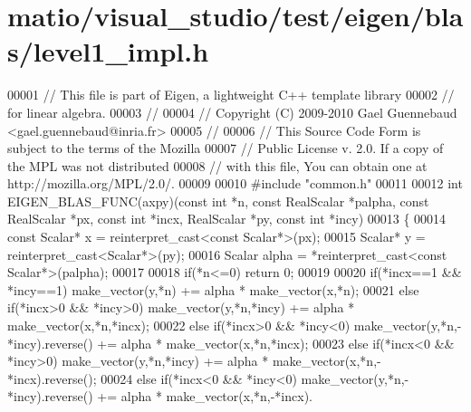 \hypertarget{matio_2visual__studio_2test_2eigen_2blas_2level1__impl_8h_source}{}\section{matio/visual\+\_\+studio/test/eigen/blas/level1\+\_\+impl.h}
\label{matio_2visual__studio_2test_2eigen_2blas_2level1__impl_8h_source}

\begin{DoxyCode}
00001 \textcolor{comment}{// This file is part of Eigen, a lightweight C++ template library}
00002 \textcolor{comment}{// for linear algebra.}
00003 \textcolor{comment}{//}
00004 \textcolor{comment}{// Copyright (C) 2009-2010 Gael Guennebaud <gael.guennebaud@inria.fr>}
00005 \textcolor{comment}{//}
00006 \textcolor{comment}{// This Source Code Form is subject to the terms of the Mozilla}
00007 \textcolor{comment}{// Public License v. 2.0. If a copy of the MPL was not distributed}
00008 \textcolor{comment}{// with this file, You can obtain one at http://mozilla.org/MPL/2.0/.}
00009 
00010 \textcolor{preprocessor}{#include "common.h"}
00011 
00012 \textcolor{keywordtype}{int} EIGEN\_BLAS\_FUNC(axpy)(\textcolor{keyword}{const} \textcolor{keywordtype}{int} *n, \textcolor{keyword}{const} RealScalar *palpha, \textcolor{keyword}{const} RealScalar *px, \textcolor{keyword}{const} \textcolor{keywordtype}{int} *incx, 
      RealScalar *py, \textcolor{keyword}{const} \textcolor{keywordtype}{int} *incy)
00013 \{
00014   \textcolor{keyword}{const} Scalar* x = \textcolor{keyword}{reinterpret\_cast<}\textcolor{keyword}{const }Scalar*\textcolor{keyword}{>}(px);
00015   Scalar* y = \textcolor{keyword}{reinterpret\_cast<}Scalar*\textcolor{keyword}{>}(py);
00016   Scalar alpha  = *\textcolor{keyword}{reinterpret\_cast<}\textcolor{keyword}{const }Scalar*\textcolor{keyword}{>}(palpha);
00017 
00018   \textcolor{keywordflow}{if}(*n<=0) \textcolor{keywordflow}{return} 0;
00019 
00020   \textcolor{keywordflow}{if}(*incx==1 && *incy==1)    make\_vector(y,*n) += alpha * make\_vector(x,*n);
00021   \textcolor{keywordflow}{else} \textcolor{keywordflow}{if}(*incx>0 && *incy>0) make\_vector(y,*n,*incy) += alpha * make\_vector(x,*n,*incx);
00022   \textcolor{keywordflow}{else} \textcolor{keywordflow}{if}(*incx>0 && *incy<0) make\_vector(y,*n,-*incy).reverse() += alpha * make\_vector(x,*n,*incx);
00023   \textcolor{keywordflow}{else} \textcolor{keywordflow}{if}(*incx<0 && *incy>0) make\_vector(y,*n,*incy) += alpha * make\_vector(x,*n,-*incx).reverse();
00024   \textcolor{keywordflow}{else} \textcolor{keywordflow}{if}(*incx<0 && *incy<0) make\_vector(y,*n,-*incy).reverse() += alpha * make\_vector(x,*n,-*incx).

\end{DoxyCode}
